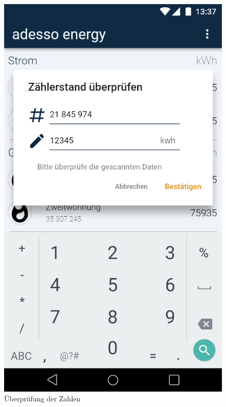 \begin{figure}[h]
	\includegraphics[scale = 0.22]{img/AndroidMockup/check}		
	\caption{Überprüfung der Zahlen}
	\label{fig:mock-pw}
\end{figure}

